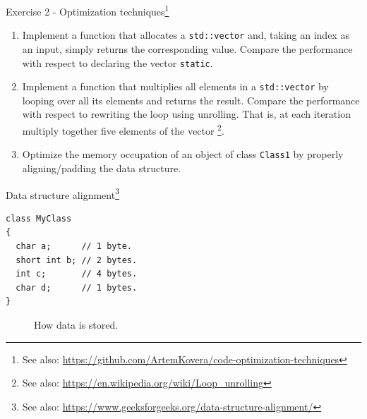 \documentclass[10pt,aspectratio=169]{beamer}
\begin{document}
\begin{frame}{Exercise 2 - Optimization techniques\footnote{See also: \url{https://github.com/ArtemKovera/code-optimization-techniques}}}
    \begin{enumerate}
        \item Implement a function that allocates a \texttt{std::vector} and, taking an index as an input, simply returns the corresponding value. Compare the performance with respect to declaring the vector \texttt{static}.
        \item Implement a function that multiplies all elements in a \texttt{std::vector} by looping over all its elements and returns the result. Compare the performance with respect to rewriting the loop using unrolling. That is, at each iteration multiply together five elements of the vector \footnote{See also: \url{https://en.wikipedia.org/wiki/Loop_unrolling}}.
        \item Optimize the memory occupation of an object of class \texttt{Class1} by properly aligning/padding the data structure.
    \end{enumerate}
\end{frame}

\begin{frame}[fragile]{Data structure alignment\footnote{See also: \url{https://www.geeksforgeeks.org/data-structure-alignment/}}}
    \begin{lstlisting}
class MyClass
{
  char a;      // 1 byte.
  short int b; // 2 bytes.
  int c;       // 4 bytes.
  char d;      // 1 bytes.
}
    \end{lstlisting}
    \begin{figure}
        \centering
        \caption{How data is  stored.}
    \end{figure}
\end{frame}
\end{document}

